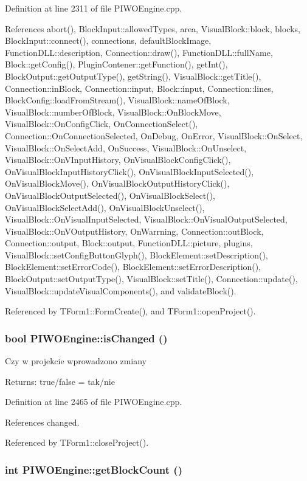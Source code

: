 Definition at line 2311 of file PIWOEngine.cpp.

References abort(), BlockInput::allowedTypes, area, VisualBlock::block, blocks, BlockInput::connect(), connections, defaultBlockImage, FunctionDLL::description, Connection::draw(), FunctionDLL::fullName, Block::getConfig(), PluginContener::getFunction(), getInt(), BlockOutput::getOutputType(), getString(), VisualBlock::getTitle(), Connection::inBlock, Connection::input, Block::input, Connection::lines, BlockConfig::loadFromStream(), VisualBlock::nameOfBlock, VisualBlock::numberOfBlock, VisualBlock::OnBlockMove, VisualBlock::OnConfigClick, OnConnectionSelect(), Connection::OnConnectionSelected, OnDebug, OnError, VisualBlock::OnSelect, VisualBlock::OnSelectAdd, OnSuccess, VisualBlock::OnUnselect, VisualBlock::OnVInputHistory, OnVisualBlockConfigClick(), OnVisualBlockInputHistoryClick(), OnVisualBlockInputSelected(), OnVisualBlockMove(), OnVisualBlockOutputHistoryClick(), OnVisualBlockOutputSelected(), OnVisualBlockSelect(), OnVisualBlockSelectAdd(), OnVisualBlockUnselect(), VisualBlock::OnVisualInputSelected, VisualBlock::OnVisualOutputSelected, VisualBlock::OnVOutputHistory, OnWarrning, Connection::outBlock, Connection::output, Block::output, FunctionDLL::picture, plugins, VisualBlock::setConfigButtonGlyph(), BlockElement::setDescription(), BlockElement::setErrorCode(), BlockElement::setErrorDescription(), BlockOutput::setOutputType(), VisualBlock::setTitle(), Connection::update(), VisualBlock::updateVisualComponents(), and validateBlock().

Referenced by TForm1::FormCreate(), and TForm1::openProject().\hypertarget{classPIWOEngine_994cb25914cba46f02bdf14909991247}{
\subsubsection[isChanged]{\setlength{\rightskip}{0pt plus 5cm}bool PIWOEngine::isChanged ()}}
\label{classPIWOEngine_994cb25914cba46f02bdf14909991247}


Czy w projekcie wprowadzono zmiany \begin{Desc}
\item[Returns:]true/false = tak/nie \end{Desc}


Definition at line 2465 of file PIWOEngine.cpp.

References changed.

Referenced by TForm1::closeProject().\hypertarget{classPIWOEngine_070ee971be58a47520dd7e5063e5508e}{
\subsubsection[getBlockCount]{\setlength{\rightskip}{0pt plus 5cm}int PIWOEngine::getBlockCount ()}}
\label{classPIWOEngine_070ee971be58a47520dd7e5063e5508e}


